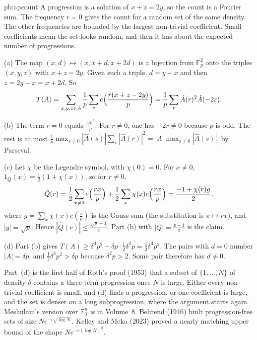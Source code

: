 \begin{solution}{pb:apcount}
\idea A progression is a solution of $x+z=2y$, so the count is a Fourier sum. The frequency $r=0$ gives the count for a random set of the same density. The other frequencies are bounded by the largest non-trivial coefficient. Small coefficients mean the set looks random, and then it has about the expected number of progressions.

\writeup (a) The map $(x,d)\mapsto(x,x+d,x+2d)$ is a bijection from $\mathbb F_p^2$ onto the triples $(x,y,z)$ with $x+z=2y$. Given such a triple,
$d=y-x$ and then $z=2y-x=x+2d$. So
\[
T(A)=\sum_{x,y,z\in A}\frac1p\sum_re\Bigl(\frac{r(x+z-2y)}p\Bigr)=\frac1p\sum_r\hat A(r)^2\hat A(-2r).
\]

(b) The term $r=0$ equals $\frac{|A|^3}p$. For $r\ne0$, one has $-2r\ne0$ because $p$ is odd. The rest is at most
$\frac1p\max_{s\ne0}|\hat A(s)|\sum_r|\hat A(r)|^2=|A|\max_{s\ne0}|\hat A(s)|$, by Parseval.

(c) Let $\chi$ be the Legendre symbol, with $\chi(0)=0$. For $x\ne0$, $1_Q(x)=\frac12(1+\chi(x))$, so for $r\ne0$,
\[
\hat Q(r)=\frac12\sum_{x\ne0}e\Bigl(\frac{rx}p\Bigr)+\frac12\sum_x\chi(x)e\Bigl(\frac{rx}p\Bigr)=\frac{-1+\chi(r)g}2,
\]
where $g=\sum_x\chi(x)e(\frac xp)$ is the Gauss sum (the substitution is $x\mapsto\bar rx$), and $|g|=\sqrt p$. Hence $|\hat Q(r)|\le\frac{\sqrt p+1}2$. Part (b) with
$|Q|=\frac{p-1}2$ is the claim.

(d) Part (b) gives $T(A)\ge\delta^3p^2-\delta p\cdot\frac12\delta^2p=\frac12\delta^3p^2$. The pairs with $d=0$ number $|A|=\delta p$, and $\frac12\delta^3p^2>\delta p$ because
$\delta^2p>2$. Some pair therefore has $d\ne0$.

\leads Part~(d) is the first half of Roth's proof (1953) that a subset of $\{1,\dots,N\}$ of density $\delta$ contains a three-term
progression once $N$ is large. Either every non-trivial coefficient is small, and (d) finds a progression, or one coefficient is large, and
the set is denser on a long subprogression, where the argument starts again. Meshulam's version over $\mathbb F_3^n$ is in Volume~8. Behrend (1946)
built progression-free sets of size $Ne^{-c\sqrt{\log N}}$. Kelley and Meka (2023) proved a nearly matching upper bound of the
shape $Ne^{-c(\log N)^\beta}$.
\end{solution}

